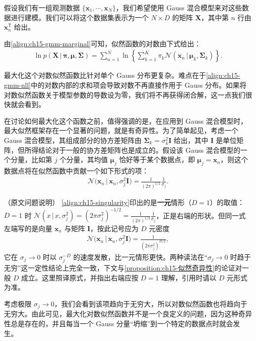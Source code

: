 \documentclass[../../main.tex]{subfiles}
\begin{document}
假设我们有一组观测数据 $\{\bm{x}_1,\cdots,\bm{x}_N\}$，我们希望使用 Gauss 混合模型来对这些数据进行建模。我们可以将这个数据集表示为一个 $N\times D$ 的矩阵 $\bm{X}$，其中第 $n$ 行由 $\bm{x}_n^{\mathsf T}$ 给出。

由\eqref{align:ch15-gmm-marginal}可知，似然函数的对数由下式给出：
\begin{align}
\ln p(\bm{X}\,|\,\bm{\pi},\bm{\mu},\bm{\Sigma})=\sum_{n=1}^{N}\ln\!\left\{\sum_{k=1}^{K}\pi_k\mathcal{N}(\bm{x}_n\,|\,\bm{\mu}_k,\bm{\Sigma}_k)\right\}.
\label{align:ch15-gmm-nll}
\end{align}

最大化这个对数似然函数比针对单个 Gauss 分布更复杂。难点在于\eqref{align:ch15-gmm-nll}中的对数内部的求和项会导致对数不再直接作用于 Gauss 分布。如果将对数似然函数关于模型参数的导数设为零，我们将不再获得闭合解，这一点我们很快就会看到。

在讨论如何最大化这个函数之前，值得强调的是，在应用到 Gauss 混合模型时，最大似然框架存在一个显著的问题，就是有奇异性。为了简单起见，考虑一个 Gauss 混合模型，其组成部分的协方差矩阵由 $\bm{\Sigma}_k=\sigma_k^2\bm{I}$ 给出，其中 $\bm{I}$ 是单位矩阵，但所得结论对于一般的协方差矩阵也是成立的。假设该 Gauss 混合模型的一个分量，比如第 $j$ 个分量，其均值 $\bm{\mu}_j$ 恰好等于某个数据点，即 $\bm{\mu}_j=\bm{x}_n$，则这个数据点将在似然函数中贡献一个如下形式的项：
\begin{align}
\mathcal{N}\big(\bm{x}_n\,|\,\bm{x}_n,\sigma_j^2\bm{I}\big)=\frac{1}{(2\pi)^{1/2}}\frac{1}{\sigma_j}.
\label{align:ch15-singularity}
\end{align}

\begin{remark}（原文问题说明）
\eqref{align:ch15-singularity}印出的是\textbf{一元}情形（$D=1$）的取值：$D=1$ 时 $\mathcal{N}(x\,|\,x,\sigma_j^2)=(2\pi\sigma_j^2)^{-1/2}=\frac{1}{(2\pi)^{1/2}}\frac{1}{\sigma_j}$，正是右端的形状。但同一式左端写的是向量 $\bm{x}_n$ 与矩阵 $\bm{I}$，按此记号应为 $D$ 元密度
\begin{align*}
\mathcal{N}\big(\bm{x}_n\,|\,\bm{x}_n,\sigma_j^2\bm{I}\big)=\frac{1}{(2\pi\sigma_j^2)^{D/2}},
\end{align*}
它在 $\sigma_j\to0$ 时以 $\sigma_j^{-D}$ 的速度发散，比一元情形更快。两种读法在“$\sigma_j\to0$ 时趋于无穷”这一定性结论上完全一致，下文与\cref{proposition:ch15-似然奇异性}的论证对一般 $D$ 成立。这里照译原式，并指出右端应按 $D=1$ 理解，引用时请以 $D$ 元形式为准。
\end{remark}

考虑极限 $\sigma_j\rightarrow0$，我们会看到该项趋向于无穷大，所以对数似然函数也将趋向于无穷大。由此可见，最大化对数似然函数并不是一个良定义的问题，因为这种奇异性总是存在的，并且每当一个 Gauss 分量“坍缩”到一个特定的数据点时就会发生。
\end{document}
